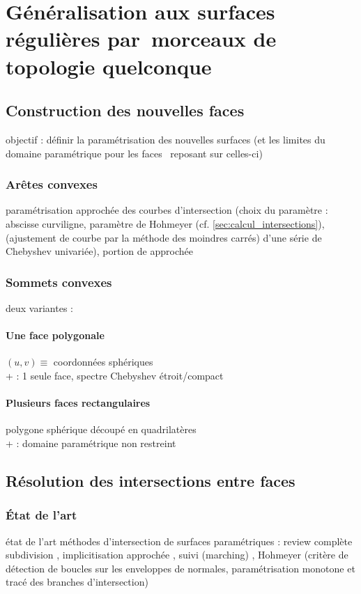 \chapter[Généralisation aux surfaces de topologie quelconque]{Généralisation aux surfaces régulières par~morceaux de topologie quelconque}
\label{chap:multi_patch}

\section{Construction des nouvelles faces}

objectif : définir la paramétrisation des nouvelles surfaces (et les limites du domaine paramétrique pour les faces \brep\ reposant sur celles-ci)

\subsection{Arêtes convexes}
paramétrisation approchée des courbes d'intersection (choix du paramètre : abscisse curviligne, paramètre de Hohmeyer (cf. \autoref{sec:calcul_intersections}),  (ajustement de courbe par la méthode des moindres carrés) d'une série de Chebyshev univariée), portion de  approchée 

\subsection{Sommets convexes}
deux variantes :

\subsubsection{Une face polygonale}
$(u,v) \equiv$ coordonnées sphériques\\
+ : 1 seule face, spectre Chebyshev étroit/compact


\subsubsection{Plusieurs faces rectangulaires}
polygone sphérique découpé en quadrilatères \cite{hahn1989}\\
+ : domaine paramétrique non restreint


\section{Résolution des intersections entre faces}
\subsection{État de l'art}
état de l'art méthodes d'intersection de surfaces paramétriques :
review complète \cite{patrikalakis2009}\\
subdivision \cite{houghton1985}, implicitisation approchée \cite{dokken2001}, suivi (marching) \cite{barnhill1990}, Hohmeyer \cite{hohmeyer1992} (critère de détection de boucles sur les enveloppes de normales, paramétrisation monotone et tracé des branches d'intersection)



